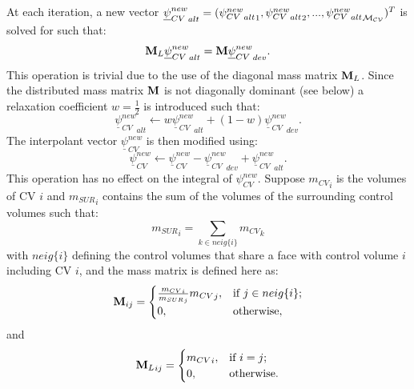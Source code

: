 At each iteration, a new vector ${\underline\psi_{CV}^{new}}_{alt} =( {{\psi_{CV}^{new}}_{alt}}_1,{{\psi_{CV}^{new}}_{alt}}_2, ...,  {{\psi_{CV}^{new}}_{alt}}_{\cal M_{CV}})^T$ is solved for such that: 
\begin{equation}
{\bf M}_L {\underline\psi_{CV}^{new}}_{alt} = {\bf M} {\underline\psi_{CV}^{new}}_{dev} .
\label{q_alt}
\end{equation}
This operation is trivial due to the use of the diagonal mass matrix ${\bf M}_L$. 
Since the distributed mass matrix $\bf M$ is not diagonally dominant (see below) 
a relaxation coefficient $w=\frac{1}{2}$ is introduced such that: 
\begin{equation}
{\underline\psi_{CV}^{new}}_{alt} \leftarrow w {\underline\psi_{CV}^{new}}_{alt}+(1-w) {\underline\psi_{CV}^{new}}_{dev}. 
\label{q_alt_relax}
\end{equation}
The interpolant vector $\underline\psi_{CV}^{new}$ is then modified using: 
\begin{equation}
\underline\psi_{CV}^{new} \leftarrow \underline\psi_{CV}^{new} - {\underline\psi_{CV}^{new}}_{dev} + {\underline\psi_{CV}^{new}}_{alt} . 
\label{q_update}
\end{equation}
This operation has no effect on the integral of $\psi_{CV}^{new}$. 
Suppose ${m_{CV}}_i$ is the volumes of CV $i$  
and ${m_{SUR}}_i$ contains the sum of the volumes of the surrounding control volumes such that:
\begin{equation}
{m_{SUR}}_i = \sum_{k\in neig\{i\}} {m_{CV}}_k
\label{m_sur}
\end{equation}
with $neig\{i\}$ defining the control volumes that share a face with control volume $i$ including CV $i$, 
and the  
mass matrix is defined here as: 
\begin{equation}
{\bf M}_{ij} =  
  \begin{cases}
   \frac{  {m_{CV}}_i }{ {m_{SUR}}_j} {m_{CV}}_j, & \text{if} \
    j\in neig\{i\}; \\
    0,  & \text{otherwise},
  \end{cases}
\label{M-def}
\end{equation}
and
\begin{equation}
{{\bf M}_L}_{ij} =  
  \begin{cases}
   {m_{CV}}_i, & \text{if} \
    i=j ; \\
    0,  & \text{otherwise}.
  \end{cases}
\label{ML-def}
\end{equation}

